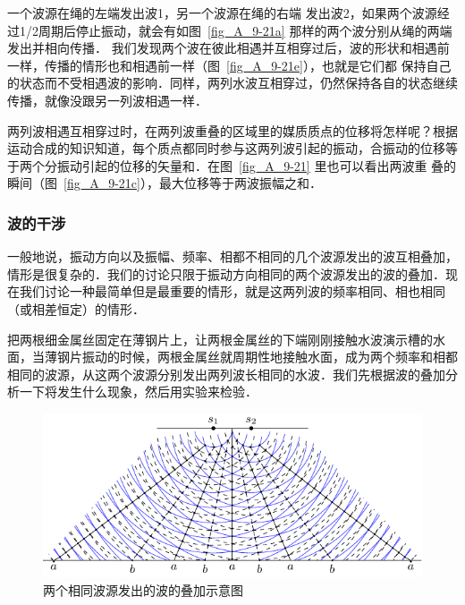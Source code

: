 一个波源在绳的左端发出波1，另一个波源在绳的右端
发出波2，如果两个波源经过1/2周期后停止振动，就会有如图~\ref{fig_A_9-21a} 那样的两个波分别从绳的两端发出并相向传播．
我们发现两个波在彼此相遇并互相穿过后，波的形状和相遇前一样，传播的情形也和相遇前一样（图~\ref{fig_A_9-21e}），也就是它们都
保持自己的状态而不受相遇波的影响．同样，两列水波互相穿过，仍然保持各自的状态继续传播，就像没跟另一列波相遇一样．


两列波相遇互相穿过时，在两列波重叠的区域里的媒质质点的位移将怎样呢？根据运动合成的知识知道，每个质点都同时参与这两列波引起的振动，合振动的位移等于两个分振动引起的位移的矢量和．在图~\ref{fig_A_9-21} 里也可以看出两波重
叠的瞬间（图~\ref{fig_A_9-21c}），最大位移等于两波振幅之和．


\subsubsection{波的干涉} 

一般地说，振动方向以及振幅、频率、相都不相同的几个波源发出的波互相叠加，情形是很复杂的．我们的讨论只限于振动方向相同的两个波源发出的波的叠加．现在我们讨论一种最简单但是最重要的情形，就是这两列波的频率相同、相也相同（或相差恒定）的情形．

把两根细金属丝固定在薄钢片上，让两根金属丝的下端刚刚接触水波演示槽的水面，当薄钢片振动的时候，两根金属丝就周期性地接触水面，成为两个频率和相都相同的波源，从这两个波源分别发出两列波长相同的水波．我们先根据波的叠加分析一下将发生什么现象，然后用实验来检验．
\begin{figure}[htbp]
    \centering
    \includegraphics{fig/A/9-22.pdf}
    \caption{两个相同波源发出的波的叠加示意图}\label{fig_A_9-22}
\end{figure}

